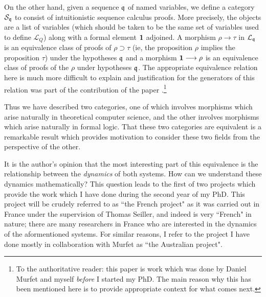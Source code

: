 \documentclass[12pt]{article}
\theoremstyle{plain}
\theoremstyle{definition}
\newcommand{\call}[1]{\mathcal{#1}}
\newcommand{\lto}{\longrightarrow}
\begin{document}
	On the other hand, given a sequence $\frak{q}$ of named variables, we define a category $\call{S}_\frak{q}$ to consist of intuitionistic sequence calculus proofs. More precisely, the objects are a list of variables (which should be taken to be the same set of variables used to define $\call{L}_Q$) along with a formal element $\bold{1}$ adjoined. A morphism $\rho \lto \tau$ in $\call{L}_{\frak{q}}$ is an equivalence class of proofs of $\rho \supset \tau$ (ie, the proposition $\rho$ implies the proposition $\tau$) under the hypotheses $\frak{q}$ and a morphism $\bold{1} \lto \rho$ is an equivalence class of proofs of the $\rho$ under hypotheses $\frak{q}$. The appropriate equivalence relation here is much more difficult to explain and justification for the generators of this relation was part of the contribution of the paper \cite{GMZ}.\footnote{To the authoritative reader: this paper is work which was done by Daniel Murfet and myself \emph{before} I started my PhD. The main reason why this has been mentioned here is to provide appropriate context for what comes next.}
	
	Thus we have described two categories, one of which involves morphisms which arise naturally in theoretical computer science, and the other involves morphisms which arise naturally in formal logic. That these two categories are equivalent \cite[Theorem 4.15]{GMZ} is a remarkable result which provides motivation to consider these two fields from the perspective of the other.
	
	It is the author's opinion that the most interesting part of this equivalence is the relationship between the \emph{dynamics} of both systems. How can we understand these dynamics mathematically? This question leads to the first of two projects which provide the work which I have done during the second year of my PhD. This project will be crudely referred to as ``the French project" as it was carried out in France under the supervision of Thomas Seiller, and indeed is very ``French" in nature; there are many researchers in France who are interested in the dynamics of the aformentioned systems. For similar reasons, I refer to the project I have done mostly in collaboration with Murfet as ``the Australian project".
	
\end{document}
